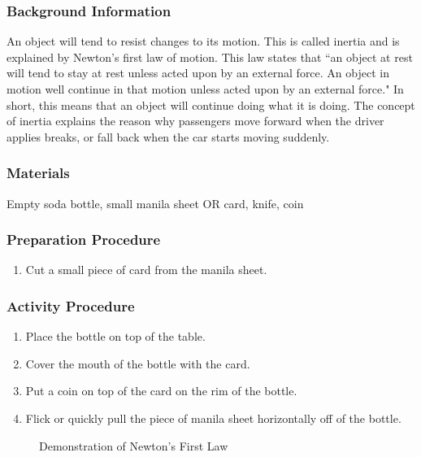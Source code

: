 \subsubsection*{Background Information}
An object will tend to resist changes to its motion. This is called inertia and is explained by Newton's first law of motion. This law states that ``an object at rest will tend to stay at rest unless acted upon by an external force. An object in motion well continue in that motion unless acted upon by an external force."  In short, this means that an object will continue doing what it is doing. The concept of inertia explains the reason why passengers move forward when the driver applies breaks, or fall back when the car starts moving suddenly.

\subsubsection*{Materials}
Empty soda bottle, small manila sheet OR card, knife, coin

\subsubsection*{Preparation Procedure}
\begin{enumerate}
\item{Cut a small piece of card from the manila sheet.} 
\end{enumerate}

\subsubsection*{Activity Procedure}
\begin{enumerate}
\item{Place the bottle on top of the table.} 
\item{Cover the mouth of the bottle with the card.} 
\item{Put a coin on top of the card on the rim of the bottle.} 
\item{Flick or quickly pull the piece of manila sheet horizontally off of the bottle.} 
\end{enumerate}

\begin{figure}
\begin{center}
\def\svgwidth{200pt}

\caption{Demonstration of Newton's First Law}
\label{fig:inertia}
\end{center}
\end{figure}

